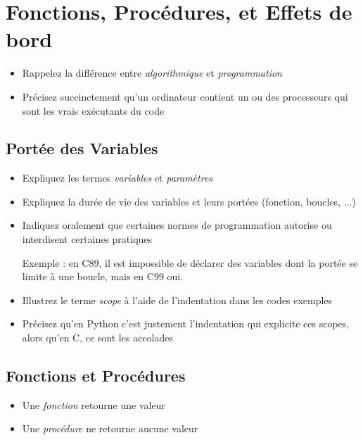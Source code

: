 \documentclass[11pt,a4paper]{article}
\begin{document}
\bigskip


\section{Fonctions, Procédures, et Effets de bord}

\begin{itemize}
\item Rappelez la différence entre \textit{algorithmique} et \textit{programmation}
\item Précisez succinctement qu'un ordinateur contient un ou des processeurs qui sont les vrais exécutants du code
\end{itemize}


\subsection{Portée des Variables}

\begin{itemize}
\item Expliquez les termes \textit{variables} et \textit{paramètres}
\item Expliquez la durée de vie des variables et leurs portées (fonction, boucles, ...)
\item Indiquez oralement que certaines normes de programmation autorise ou interdisent certaines pratiques

Exemple : en C89, il est impossible de déclarer des variables dont la portée se limite à une boucle, mais en C99 oui.
\item Illustrez le terme \textit{scope} à l'aide de l'indentation dans les codes exemples
\item Précisez qu'en Python c'est justement l'indentation qui explicite ces scopes, alors qu'en C, ce sont les accolades
\end{itemize}


\subsection{Fonctions et Procédures}

\begin{itemize}
\item Une \textit{fonction} retourne une valeur
\item Une \textit{procédure} ne retourne aucune valeur
\end{itemize}
\end{document}
